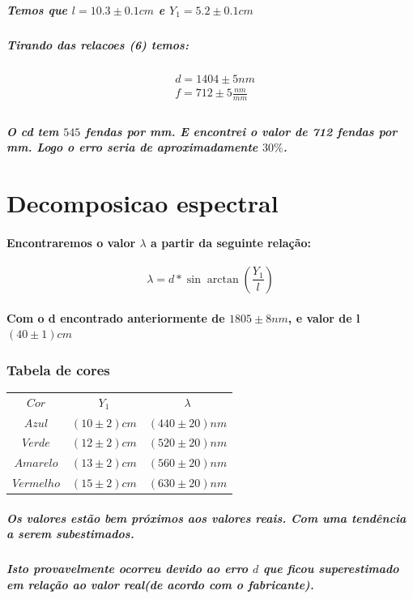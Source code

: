 \documentclass[12pt,twoside, a4paper, twocolumn]{article}
\begin{document}
\subparagraph*{Temos que $l = 10.3 \pm 0.1 cm$ e $Y_1 = 5.2 \pm 0.1 cm$}

\subparagraph*{Tirando das relacoes (6) temos:}

\begin{equation}
  \begin{aligned}
     & d = 1404 \pm 5 nm           \\
     & f = 712 \pm 5 \frac{nm}{mm} \\
  \end{aligned}
\end{equation}

\subparagraph*{O cd tem $545$ fendas por mm. E encontrei o valor de 712 fendas por mm. Logo o erro seria de aproximadamente $30\%$.}

\newpage

\section{Decomposicao espectral}

\paragraph*{Encontraremos o valor $\lambda$ a partir da seguinte relação:}
\begin{equation}
  \lambda = d * \sin{\arctan{\left(\frac{Y_1}{l}\right)}}
\end{equation}

\paragraph*{Com o d encontrado anteriormente de $1805 \pm 8 nm$, e valor de l $ (40 \pm 1)cm$}


\subsubsection{Tabela de cores}
\begin{center}
  \begin{tabular}{ |c|c|c| }
    \hline
    $Cor$      & $Y_1$          & $\lambda$        \\
    $Azul$     & $(10 \pm 2)cm$ & $(440 \pm 20)nm$ \\
    $Verde$    & $(12 \pm 2)cm$ & $(520 \pm 20)nm$ \\
    $Amarelo$  & $(13 \pm 2)cm$ & $(560 \pm 20)nm$ \\
    $Vermelho$ & $(15 \pm 2)cm$ & $(630 \pm 20)nm$ \\

    \hline
  \end{tabular}
\end{center}

\subparagraph*{Os valores estão bem próximos aos valores reais. Com uma tendência a serem subestimados. }

\subparagraph*{Isto provavelmente ocorreu devido ao erro $d$ que ficou superestimado em relação ao valor real(de acordo com o fabricante).}
\end{document}
